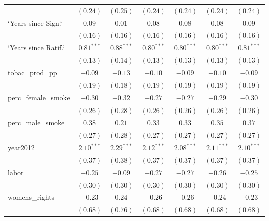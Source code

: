 \begin{table}[!h]
\begin{center}
\begin{tabular}{l c c c c c c }
                        & $(0.24)$     & $(0.25)$     & $(0.24)$     & $(0.24)$     & $(0.24)$     & $(0.24)$     \\
`Years since Sign.`     & $0.09$       & $0.01$       & $0.08$       & $0.08$       & $0.08$       & $0.09$       \\
                        & $(0.16)$     & $(0.16)$     & $(0.16)$     & $(0.16)$     & $(0.16)$     & $(0.16)$     \\
`Years since Ratif.`    & $0.81^{***}$ & $0.88^{***}$ & $0.80^{***}$ & $0.80^{***}$ & $0.80^{***}$ & $0.81^{***}$ \\
                        & $(0.13)$     & $(0.14)$     & $(0.13)$     & $(0.13)$     & $(0.13)$     & $(0.13)$     \\
tobac\_prod\_pp         & $-0.09$      & $-0.13$      & $-0.10$      & $-0.09$      & $-0.10$      & $-0.09$      \\
                        & $(0.19)$     & $(0.18)$     & $(0.19)$     & $(0.19)$     & $(0.19)$     & $(0.19)$     \\
perc\_female\_smoke     & $-0.30$      & $-0.32$      & $-0.27$      & $-0.27$      & $-0.29$      & $-0.30$      \\
                        & $(0.26)$     & $(0.28)$     & $(0.26)$     & $(0.26)$     & $(0.26)$     & $(0.26)$     \\
perc\_male\_smoke       & $0.38$       & $0.21$       & $0.33$       & $0.33$       & $0.35$       & $0.37$       \\
                        & $(0.27)$     & $(0.28)$     & $(0.27)$     & $(0.27)$     & $(0.27)$     & $(0.27)$     \\
year2012                & $2.10^{***}$ & $2.29^{***}$ & $2.12^{***}$ & $2.08^{***}$ & $2.11^{***}$ & $2.10^{***}$ \\
                        & $(0.37)$     & $(0.38)$     & $(0.37)$     & $(0.37)$     & $(0.37)$     & $(0.37)$     \\
labor                   & $-0.25$      & $-0.09$      & $-0.27$      & $-0.27$      & $-0.26$      & $-0.25$      \\
                        & $(0.30)$     & $(0.30)$     & $(0.30)$     & $(0.30)$     & $(0.30)$     & $(0.30)$     \\
womens\_rights          & $-0.23$      & $0.24$       & $-0.26$      & $-0.26$      & $-0.24$      & $-0.23$      \\
                        & $(0.68)$     & $(0.76)$     & $(0.68)$     & $(0.68)$     & $(0.68)$     & $(0.68)$     \\

\end{tabular}
\end{center}
\end{table}
